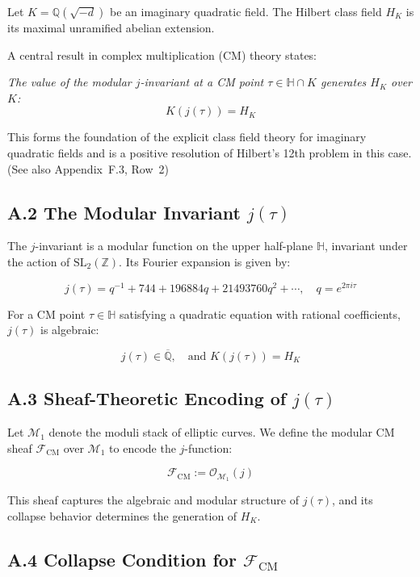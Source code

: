 \documentclass[11pt]{article}
\begin{document}
Let \( K = \mathbb{Q}(\sqrt{-d}) \) be an imaginary quadratic field.  
The Hilbert class field \( H_K \) is its maximal unramified abelian extension.

A central result in complex multiplication (CM) theory states:

\begin{center}
\textit{
The value of the modular \( j \)-invariant at a CM point \( \tau \in \mathbb{H} \cap K \) generates \( H_K \) over \( K \):
\[
K(j(\tau)) = H_K
\]
}
\end{center}

This forms the foundation of the explicit class field theory for imaginary quadratic fields and is a positive resolution of Hilbert's 12th problem in this case. (See also Appendix~F.3, Row~2)

\subsection*{A.2 The Modular Invariant \( j(\tau) \)}

The \( j \)-invariant is a modular function on the upper half-plane \( \mathbb{H} \), invariant under the action of \( \mathrm{SL}_2(\mathbb{Z}) \).  
Its Fourier expansion is given by:

\[
j(\tau) = q^{-1} + 744 + 196884q + 21493760q^2 + \cdots, \quad q = e^{2\pi i \tau}
\]

For a CM point \( \tau \in \mathbb{H} \) satisfying a quadratic equation with rational coefficients, \( j(\tau) \) is algebraic:

\[
j(\tau) \in \overline{\mathbb{Q}}, \quad \text{and } K(j(\tau)) = H_K
\]

\subsection*{A.3 Sheaf-Theoretic Encoding of \( j(\tau) \)}

Let \( \mathcal{M}_1 \) denote the moduli stack of elliptic curves.  
We define the modular CM sheaf \( \mathcal{F}_{\mathrm{CM}} \) over \( \mathcal{M}_1 \) to encode the \( j \)-function:

\[
\mathcal{F}_{\mathrm{CM}} := \mathcal{O}_{\mathcal{M}_1}(j)
\]

This sheaf captures the algebraic and modular structure of \( j(\tau) \), and its collapse behavior determines the generation of \( H_K \).

\subsection*{A.4 Collapse Condition for \( \mathcal{F}_{\mathrm{CM}} \)}
\end{document}
